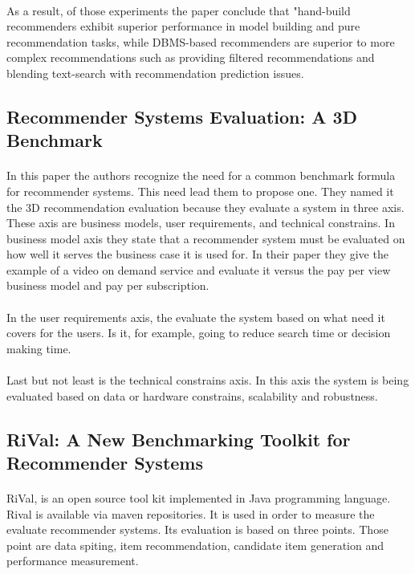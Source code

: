 \paragraph{}As a result, of those experiments the paper conclude that "hand-build recommenders exhibit superior performance in model building and pure recommendation tasks, while DBMS-based recommenders are superior to more complex recommendations such as providing filtered recommendations and blending text-search with recommendation prediction issues.

\subsection{Recommender Systems Evaluation: A 3D Benchmark \cite{said2012recommender}}
\paragraph{}In this paper the authors recognize the need for a common benchmark formula for recommender systems. This need lead them to propose one. They named it the 3D recommendation evaluation because they evaluate a system in three axis. These axis are business models, user requirements, and technical constrains. In business model axis they state that a recommender system must be evaluated on how well it serves the business case it is used for. In their paper they give the example of a video on demand service and evaluate it versus the pay per view business model and pay per subscription.

\paragraph{}In the user requirements axis, the evaluate the system based on what need it covers for the users. Is it, for example, going to reduce search time or decision making time.

\paragraph{}Last but not least is the technical constrains axis. In this axis the system is being evaluated based on data or hardware constrains, scalability and robustness.

\subsection{RiVal: A New Benchmarking Toolkit for Recommender Systems \cite{said2014rival}}
\paragraph{}RiVal, is an open source tool kit implemented in Java programming language. Rival is available via maven repositories. It is used in order to measure the evaluate recommender systems. Its evaluation is based on three points. Those point are data spiting, item recommendation, candidate item generation and performance measurement. 